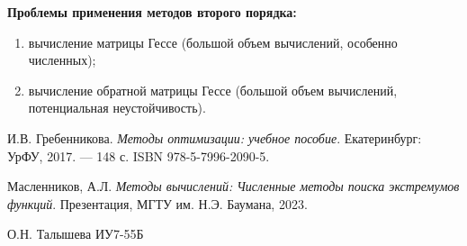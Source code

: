 \documentclass[a4paper,12pt]{article}
\begin{document}
\vspace{0.3cm}

\textbf{Проблемы применения методов второго порядка:}
\begin{enumerate}
    \item вычисление матрицы Гессе (большой объем вычислений, особенно численных);
    \item вычисление обратной матрицы Гессе (большой объем вычислений, потенциальная неустойчивость). \cite{maslennicov}
\end{enumerate}

\renewcommand{\refname}{Список использованных источников}
\begin{thebibliography}{9}

И.В. Гребенникова. \textit{Методы оптимизации: учебное пособие}. Екатеринбург: УрФУ, 2017. — 148 с. ISBN 978-5-7996-2090-5.

Масленников, А.Л. \textit{Методы вычислений: Численные методы поиска экстремумов функций}. Презентация, МГТУ им. Н.Э. Баумана, 2023.

\end{thebibliography}

\begin{flushright}
    О.Н. Талышева ИУ7-55Б
\end{flushright}
\end{document}
